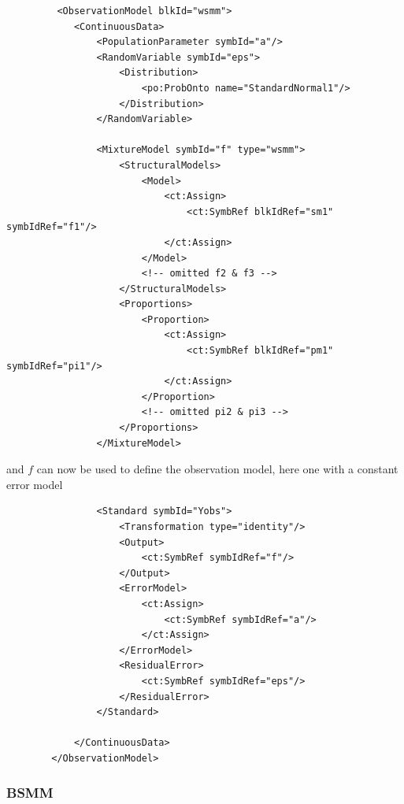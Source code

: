 \lstset{language=XML}
\begin{lstlisting}
         <ObservationModel blkId="wsmm">
            <ContinuousData>
                <PopulationParameter symbId="a"/>
                <RandomVariable symbId="eps">
                    <Distribution>
                        <po:ProbOnto name="StandardNormal1"/>
                    </Distribution>
                </RandomVariable>
                
                <MixtureModel symbId="f" type="wsmm">
                    <StructuralModels>
                        <Model>
                            <ct:Assign>
                                <ct:SymbRef blkIdRef="sm1" symbIdRef="f1"/>
                            </ct:Assign>
                        </Model>
                        <!-- omitted f2 & f3 -->
                    </StructuralModels>
                    <Proportions>
                        <Proportion>
                            <ct:Assign>
                                <ct:SymbRef blkIdRef="pm1" symbIdRef="pi1"/>
                            </ct:Assign>
                        </Proportion>
                        <!-- omitted pi2 & pi3 -->
                    </Proportions>
                </MixtureModel>
\end{lstlisting}
and $f$ can now be used to define the observation model, here one with 
a constant error model
\lstset{language=XML}
\begin{lstlisting}
                <Standard symbId="Yobs">
                    <Transformation type="identity"/>
                    <Output>
                        <ct:SymbRef symbIdRef="f"/>
                    </Output>
                    <ErrorModel>
                        <ct:Assign>
                            <ct:SymbRef symbIdRef="a"/>
                        </ct:Assign>
                    </ErrorModel>
                    <ResidualError>
                        <ct:SymbRef symbIdRef="eps"/>
                    </ResidualError>
                </Standard>
                
            </ContinuousData>
        </ObservationModel>
\end{lstlisting}



\subsubsection{BSMM}
\label{subsec:bsmm}

